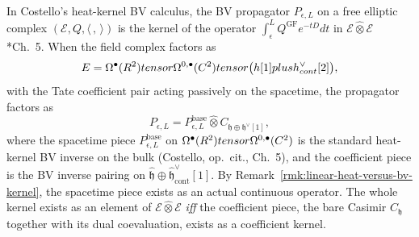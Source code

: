 \begin{rmk}\label{rmk:costello-coefficient-requirements}
  In Costello's heat-kernel BV calculus, the BV propagator
  $P_{\epsilon,L}$ on a free elliptic complex
  $(\mathcal E,Q,\langle\,,\,\rangle)$ is the kernel of the operator
  $\int_\epsilon^L Q^{\mathrm{GF}}e^{-tD}dt$ in
  $\mathcal E\widehat\otimes\mathcal E$ \cite{costello-renormalization}*{Ch.~5}.
  When the field complex factors as
  \begin{equation}\label{eq:wt-field-factor}
    E=\Omega^\bullet(R^2)tensor
      \Omega^{0,\bullet}(C^2)tensor
      \bigl(h[1]
      plush^\vee_{cont}[2]\bigr),
  \end{equation}
  with the Tate coefficient pair acting passively on the spacetime,
  the propagator factors as
  \begin{equation}\label{eq:wt-propagator-factor}
    P_{\epsilon,L}=P_{\epsilon,L}^{\mathrm{base}}\widehat\otimes
      C_{\mathfrak h\oplus\mathfrak h^\vee[1]},
  \end{equation}
  where the spacetime piece $P_{\epsilon,L}^{\mathrm{base}}$ on
  $\Omega^\bullet(R^2)tensor\Omega^{0,\bullet}(C^2)$ is the
  standard heat-kernel BV inverse on the bulk (Costello, op.\ cit., Ch.~5),
  and the coefficient piece is the BV inverse pairing on
  $\widehat{\mathfrak h}\oplus\widehat{\mathfrak h}^\vee_{\mathrm{cont}}[1]$.
  By Remark~\ref{rmk:linear-heat-versus-bv-kernel}, the spacetime piece
  exists as an actual continuous operator. The whole kernel exists as
  an element of $\mathcal E\widehat\otimes\mathcal E$ \emph{iff} the
  coefficient piece, the bare Casimir $C_{\mathfrak h}$ together with
  its dual coevaluation, exists as a coefficient kernel.


\end{rmk}
